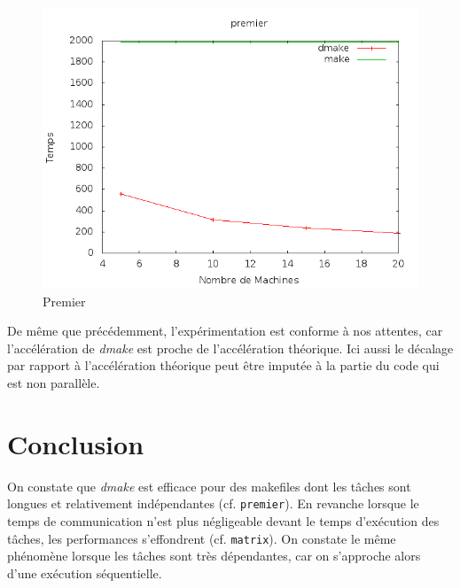 \documentclass[a4paper,12pt,twoside]{article}
\begin{document}
\begin{figure}[H]
  \centering
  \includegraphics[scale=0.5]{benchmark_premier_01.png}
  \caption{Premier}
  \label{fig:premier}
\end{figure}

De même que précédemment, l'expérimentation est conforme à nos attentes, car
l'accélération de \emph{dmake} est proche de l'accélération
théorique. Ici aussi le décalage par rapport à l'accélération théorique peut
être imputée à la partie du code qui est non parallèle. 

\section*{Conclusion}
On constate que \emph{dmake} est efficace pour des makefiles dont les
tâches sont longues et relativement indépendantes
(cf. \texttt{premier}). En revanche lorsque le temps de communication
n'est plus négligeable devant le temps d'exécution des tâches, les
performances s'effondrent (cf. \texttt{matrix}). On constate le même phénomène lorsque les
tâches sont très dépendantes, car on s'approche alors d'une exécution séquentielle.
\end{document}
